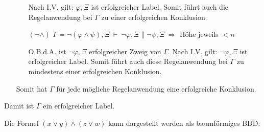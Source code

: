 \begin{itemize}
\begin{itemize}
                                Nach I.V. gilt: $\varphi, \Xi$ ist erfolgreicher Label. Somit führt auch
                                die Regelanwendung bei $\Gamma$ zu einer erfolgreichen Konklusion.
                        \item[$(\neg\wedge)$] $\Gamma = \neg (\varphi \wedge \psi), \Xi \ \vdash \ \neg \varphi, \Xi \|
                                \neg \psi, \Xi \ \Rightarrow $ Höhe jeweils
                                $< n$

                                O.B.d.A. ist $\neg \varphi, \Xi$ erfolgreicher Zweig von $\Gamma$. Nach I.V. gilt:
                                $\neg \varphi, \Xi$ ist erfolgreicher Label. Somit führt auch diese Regelanwendung bei
                                $\Gamma$ zu mindestens einer erfolgreichen Konklusion.
                \end{itemize}
                Somit hat $\Gamma$ für jede mögliche Regelanwendung eine erfolgreiche Konklusion.
\end{itemize}
Damit ist $\Gamma$ ein erfolgreicher Label.

\newpage
{}
Die Formel $(x \vee y) \wedge (z \vee w)$ kann dargestellt werden als baumförmiges BDD:

